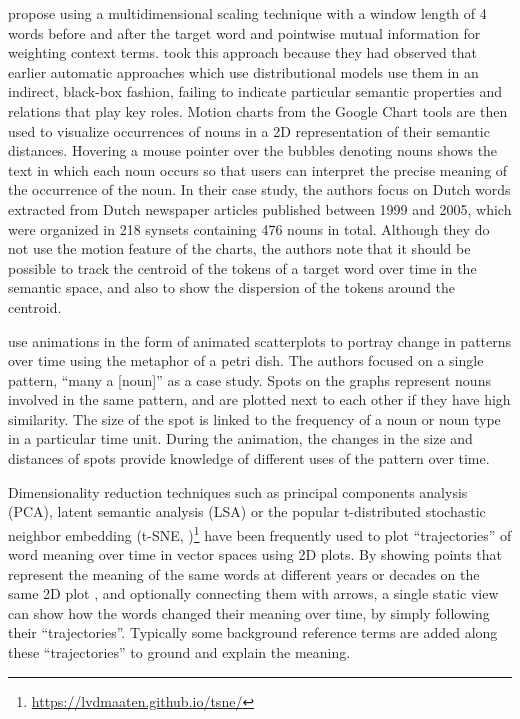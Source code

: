 \documentclass[output=paper]{langsci/langscibook}
\begin{document}
\citet{heylen2012looking} propose using a multidimensional scaling \citep{cox2008multidimensional} technique with a window length of 4 words before and after the target word and pointwise mutual information for weighting context terms. 
\citet{heylen2012looking} took this approach because they had observed that earlier automatic approaches which use distributional models use them in an indirect, black-box fashion, failing to indicate particular semantic properties and relations that play key roles. Motion charts from the Google Chart tools are then used to visualize occurrences of nouns in a 2D representation of their semantic distances. Hovering a mouse pointer over the bubbles denoting nouns shows the text in which each noun occurs so that users can interpret the precise meaning of the occurrence of the noun. In their case study, the authors focus on Dutch words extracted from Dutch newspaper articles published between 1999 and 2005, which were organized in 218 synsets containing 476 nouns in total. Although they do not use the motion feature of the charts, the authors note that it should be possible to track the centroid of the tokens of a target word over time in the semantic space, and also to show the dispersion of the tokens around the centroid.

\citet{hilpert2015meaning} use animations in the form of animated scatterplots to portray change in patterns over time using the metaphor of a petri dish. The authors focused on a single pattern, ``many a [noun]'' as a case study. Spots on the graphs represent nouns involved in the same pattern, and are plotted next to each other if they have high similarity. The size of the spot is linked to the frequency of a noun or noun type in a particular time unit. During the animation, the changes in the size and distances of spots provide knowledge of different uses of the pattern over time.

\begin{sloppypar}
Dimensionality reduction techniques such as principal components analysis (PCA), latent semantic analysis (LSA) or the popular t-distributed stochastic neighbor embedding (t-SNE, \citealt{maaten2008visualizing})\footnote{\url{https://lvdmaaten.github.io/tsne/}} have been frequently used to plot ``trajectories'' of word meaning over time in vector spaces using 2D plots. By showing points that represent the meaning of the same words at different years or decades on the same 2D plot \citep[see, e.g.,][]{hamilton-etal-2016-cultural,kulkarni2015statistically}, and optionally connecting them with arrows, a single static view can show how the words changed their meaning over time, by simply following their ``trajectories''. Typically some background reference terms are added along these ``trajectories'' to ground and explain the meaning.
\end{sloppypar}
\end{document}
